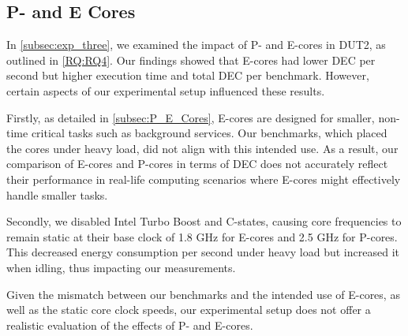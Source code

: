 \subsection{P- and E Cores}
In \cref{subsec:exp_three}, we examined the impact of P- and E-cores in DUT2, as outlined in \cref{RQ:RQ4}. Our findings showed that E-cores had lower DEC per second but higher execution time and total DEC per benchmark. However, certain aspects of our experimental setup influenced these results.

Firstly, as detailed in \cref{subsec:P_E_Cores}, E-cores are designed for smaller, non-time critical tasks such as background services. Our benchmarks, which placed the cores under heavy load, did not align with this intended use. As a result, our comparison of E-cores and P-cores in terms of DEC does not accurately reflect their performance in real-life computing scenarios where E-cores might effectively handle smaller tasks.

Secondly, we disabled Intel Turbo Boost and C-states, causing core frequencies to remain static at their base clock of 1.8 GHz for E-cores and 2.5 GHz for P-cores. This decreased energy consumption per second under heavy load but increased it when idling, thus impacting our measurements.

Given the mismatch between our benchmarks and the intended use of E-cores, as well as the static core clock speeds, our experimental setup does not offer a realistic evaluation of the effects of P- and E-cores.

